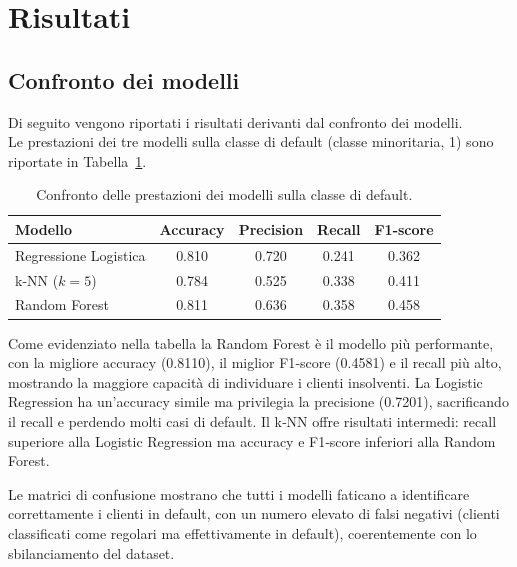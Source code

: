 \documentclass[11pt,a4paper]{article}
\begin{document}
\newpage
\section{Risultati}
\label{sec:risultati}

\subsection{Confronto dei modelli}

Di seguito vengono riportati i risultati derivanti dal confronto dei modelli.\\
Le prestazioni dei tre modelli sulla classe di default (classe minoritaria, 1) sono riportate in Tabella~\ref{tab:confronto}.

\begin{table}[H]
\centering
\caption{Confronto delle prestazioni dei modelli sulla classe di default.}
\label{tab:confronto}
\begin{tabular}{lcccc}
\toprule
\textbf{Modello} & \textbf{Accuracy} & \textbf{Precision} & \textbf{Recall} & \textbf{F1-score} \\
\midrule
Regressione Logistica & 0.810 & 0.720 & 0.241 & 0.362 \\
k-NN ($k=5$)          & 0.784 & 0.525 & 0.338 & 0.411 \\
Random Forest         & 0.811 & 0.636 & 0.358 & 0.458 \\
\bottomrule
\end{tabular}
\end{table}
 Come evidenziato nella tabella la Random Forest è il modello più performante, con la migliore accuracy (0.8110), il miglior F1‑score (0.4581) e il recall più alto, mostrando la maggiore capacità di individuare i clienti insolventi.
La Logistic Regression ha un’accuracy simile ma privilegia la precisione (0.7201), sacrificando il recall e perdendo molti casi di default.
Il k‑NN offre risultati intermedi: recall superiore alla Logistic Regression ma accuracy e F1‑score inferiori alla Random Forest.

Le matrici di confusione mostrano che tutti i modelli faticano a identificare correttamente i clienti in default, con un numero elevato di falsi negativi (clienti classificati come regolari ma effettivamente in default), coerentemente con lo sbilanciamento del dataset.
\end{document}

